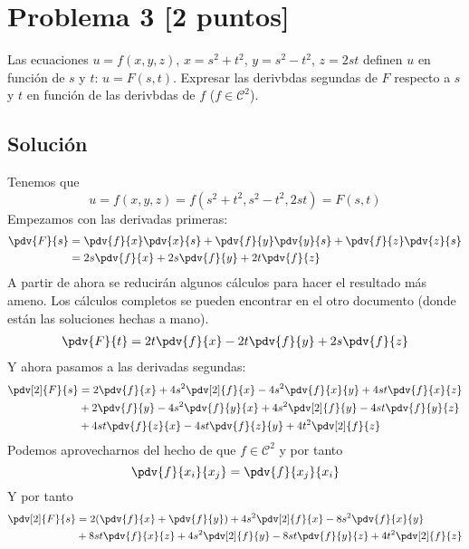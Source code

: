 \documentclass[12pt,a4paper,reqno]{article}
\newcommand{\cC}{\mathcal{C}}
\begin{document}
	\section{Problema 3 [2 puntos]}
	Las ecuaciones $u=f(x,y,z)$, $x=s^2+t^2$, $y=s^2-t^2$, $z=2st$ definen $u$ en función de $s$ y $t$: $u=F(s,t)$. Expresar las derivbdas segundas de $F$ respecto a $s$ y $t$ en función de las derivbdas de $f$ ($f\in\cC^2$).
	
	\subsection*{Solución}
	Tenemos que
	\[
		u = f(x,y,z)=f(s^{2} + t ^{2}, s ^{2}-t ^{2}, 2st)=F(s,t)
	\]
	Empezamos con las derivadas primeras:
	\begin{equation}
		\begin{split}
			\pdv{F}{s}&= \pdv{f}{x}\pdv{x}{s} + \pdv{f}{y}\pdv{y}{s} +\pdv{f}{z}\pdv{z}{s}\\
					  &= 2s \pdv{f}{x}+2s\pdv{f}{y}+2t\pdv{f}{z}
		\end{split}
	\end{equation}
	A partir de ahora se reducirán algunos cálculos para hacer el resultado más ameno. Los cálculos completos se pueden encontrar en el otro documento (donde están las soluciones hechas a mano).
	\begin{equation}
		\begin{split}
			\pdv{F}{t} = 2t\pdv{f}{x}-2t\pdv{f}{y}+2s\pdv{f}{z}
		\end{split}
	\end{equation}
	Y ahora pasamos a las derivadas segundas:
	\begin{equation}
		\begin{split}
			\pdv[2]{F}{s} &= 2\pdv{f}{x} +4s ^{2}\pdv[2]{f}{x}-4s^{2}\pdv{f}{x}{y} +4st \pdv{f}{x}{z}\\
						  &+2\pdv{f}{y} - 4s^{2}\pdv{f}{y}{x}+4s^{2}\pdv[2]{f}{y}-4st\pdv{f}{y}{z}\\
						  &+4st\pdv{f}{z}{x}-4st\pdv{f}{z}{y}+4t^{2}\pdv[2]{f}{z}
		\end{split}
	\end{equation}
	Podemos aprovecharnos del hecho de que $f \in \mathcal{C}^{2}$ y por tanto
	\[
		\pdv{f}{x_{i}}{x_{j}} = \pdv{f}{x_{j}}{x_{i}}
	\]
	Y por tanto
	\begin{equation}
		\begin{split}
			\pdv[2]{F}{s}&=2(\pdv{f}{x}+\pdv{f}{y})+4s^{2}\pdv[2]{f}{x}-8s^{2}\pdv{f}{x}{y}\\ &+8st\pdv{f}{x}{z}+4s^{2}\pdv[2]{f}{y}-8st\pdv{f}{y}{z}+4t^{2}\pdv[2]{f}{z}
		\end{split}
	\end{equation}
\end{document}
